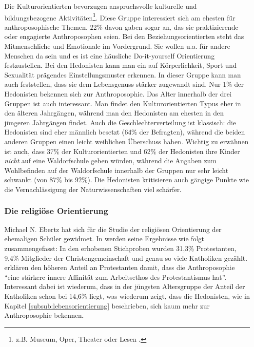Die Kulturorientierten bevorzugen anspruchsvolle kulturelle und bildungsbezogene Aktivitäten\footnote{z.B. Museum, Oper, Theater oder Lesen \citep[vgl.][S. 17]{randoll07}.}. 
Diese Gruppe interessiert sich am ehesten für anthroposophische Themen. 
22\% davon gaben sogar an, das sie praktizierende oder engagierte Anthroposophen seien. 
Bei den Beziehungsorientierten steht das Mitmenschliche und Emotionale im Vordergrund. 
Sie wollen u.a. für andere Menschen da sein und es ist eine häusliche Do-it-yourself Orientierung festzustellen. 
Bei den Hedonisten kann man ein auf Körperlichkeit, Sport und Sexualität prägendes Einstellungsmuster erkennen. 
In dieser Gruppe kann man auch feststellen, dass sie dem Lebensgenuss stärker zugewandt sind. 
Nur 1\% der Hedonisten bekennen sich zur Anthroposophie. 
Das Alter innerhalb der drei Gruppen ist auch interessant. 
Man findet den Kulturorientierten Typus eher in den älteren Jahrgängen, während man den Hedonisten am ehesten in den jüngeren Jahrgängen findet. 
Auch die Geschlechterverteilung ist klassisch: die Hedonisten sind eher männlich besetzt (64\% der Befragten), während die beiden anderen Gruppen einen leicht weiblichen Überschuss haben. 
Wichtig zu erwähnen ist auch, dass 37\% der Kulturorientierten und 62\% der Hedonisten ihre Kinder \emph{nicht} auf eine Waldorfschule geben würden, während die Angaben zum Wohlbefinden auf der Waldorfschule innerhalb der Gruppen nur sehr leicht schwankt (von 87\% bis 92\%). 
Die Hedonisten kritisieren auch gängige Punkte wie die Vernachlässigung der Naturwissenschaften viel schärfer. 

\subsubsection{Die religiöse Orientierung}

Michael N. Ebertz hat sich für die Studie der religiösen Orientierung der ehemaligen Schüler gewidmet. 
In \citet[][S. 18f]{randoll07} werden seine Ergebnisse wie folgt zusammengefasst: In den erhobenen Stichproben wurden 31,3\% Protestanten, 9,4\% Mitglieder der Christengemeinschaft und genau so viele Katholiken gezählt. 
\citet[][S. 18]{randoll07} erklären den höheren Anteil an Protestanten damit, dass die Anthroposophie \enquote{eine stärkere innere Affinität zum Arbeitsethos des Protestantismus hat}. 
Interessant dabei ist wiederum, dass in der jüngsten Altersgruppe der Anteil der Katholiken schon bei 14,6\% liegt, was wiederum zeigt, dass die Hedonisten, wie in Kapitel \ref{subsub:lebensorientierung} beschrieben, sich kaum mehr zur Anthroposophie bekennen. 

